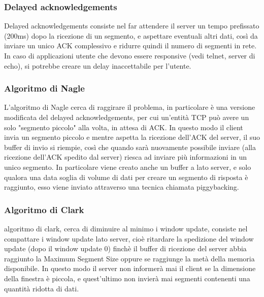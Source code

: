 \documentclass[11pt, oneside]{article}   	%
\begin{document}
\subsubsection*{Delayed acknowledgements}
Delayed acknowledgements consiste nel far attendere il server un tempo prefissato (200ms) dopo la ricezione di un segmento, e aspettare eventuali altri dati, così da inviare un unico ACK complessivo e ridurre quindi il numero di segmenti in rete. In caso di applicazioni utente che devono essere responsive (vedi telnet, server di echo), si potrebbe creare un delay inaccettabile per l'utente.
\subsubsection*{Algoritmo di Nagle}
L'algoritmo di Nagle cerca di raggirare il problema, in particolare  è una versione modificata del delayed acknowledgements, per cui un'entità TCP può avere un solo "segmento piccolo" alla volta, in attesa di ACK. In questo modo il client invia un segmento piccolo e mentre aspetta la ricezione dell'ACK del server, il suo buffer di invio si riempie, così che quando sarà nuovamente possibile inviare (alla ricezione dell'ACK spedito dal server) riesca ad inviare più informazioni in un unico segmento. In particolare viene creato anche un buffer a lato server, e solo qualora una data soglia di volume di dati per creare un segmento di risposta è raggiunto, esso viene inviato attraverso una tecnica chiamata piggybacking. 
\subsubsection*{Algoritmo di Clark}
algoritmo di clark, cerca di diminuire al minimo i window update, consiste nel compattare i window update lato server, cioè ritardare la spedizione del window update (dopo il window update 0) finchè il buffer di ricezione del server abbia raggiunto la Maximum Segment Size oppure se raggiunge la metà della memoria disponibile. In questo modo il server non informerà mai il client se la dimensione della finestra è piccola, e quest'ultimo non invierà mai segmenti contenenti una quantità ridotta di dati.
\end{document}

